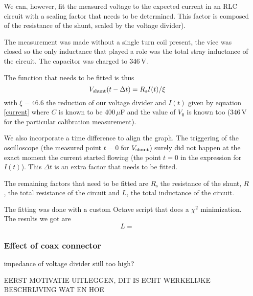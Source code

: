 We can, however, fit the measured voltage to the expected current in an RLC 
circuit with a scaling factor that needs to be determined. This factor is 
composed of the resistance of the shunt, scaled by the voltage divider). 

The measurement was made without a single turn coil present, the vice was 
closed so the only inductance that played a role was the total stray 
inductance of the circuit. The capacitor was charged to 346\,V.

The function that needs to be fitted is thus
$$
V_\mathrm{shunt}(t - \Delta t) = R_\mathrm s I(t) / \xi
$$
with $\xi = 46.6$ the reduction of our voltage divider and $I(t)$ given by 
equation \ref{current} where $C$ is known to be 400\,$\mu$F and the value 
of $V_0$ is known too (346\,V for the particular calibration measurement).

We also incorporate a time difference to align the graph. The triggering of 
the oscilloscope (the measured point $t = 0$ for $V_\mathrm{shunt}$) surely did not 
happen at the exact moment the current started flowing (the point $t = 0$ 
in the expression for $I(t)$). This $\Delta t$ is an extra factor that 
needs to be fitted.

The remaining factors that need to be fitted are $R_\mathrm s$ the 
resistance of the shunt, $R$, the total resistance of the circuit and $L$, 
the total inductance of the circuit.

The fitting was done with a custom Octave script that does a $\chi^2$ 
minimization. The results we got are
$$
L =
$$










\subsubsection{Effect of coax connector}
impedance of voltage divider still too high?

EERST MOTIVATIE UITLEGGEN, DIT IS ECHT WERKELIJKE BESCHRIJVING WAT EN HOE


